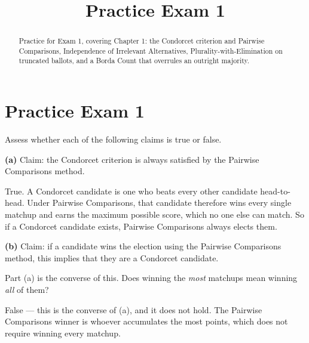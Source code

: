 \documentclass[12pt]{ximera}
\title{Practice Exam 1}
\begin{document}
\begin{abstract}
Practice for Exam 1, covering Chapter 1: the Condorcet criterion and Pairwise Comparisons,
Independence of Irrelevant Alternatives, Plurality-with-Elimination on truncated
ballots, and a Borda Count that overrules an outright majority.
\end{abstract}
\maketitle

\section*{Practice Exam 1}

\begin{problem}
Assess whether each of the following claims is true or false.

\begin{prompt}
\textbf{(a)} Claim: the Condorcet criterion is always satisfied by the Pairwise
Comparisons method.

\begin{multipleChoice}
\end{multipleChoice}

\begin{feedback}
True. A Condorcet candidate is one who beats every other candidate head-to-head. Under
Pairwise Comparisons, that candidate therefore wins every single matchup and earns the
maximum possible score, which no one else can match. So if a Condorcet candidate
exists, Pairwise Comparisons always elects them.
\end{feedback}
\end{prompt}

\begin{prompt}
\textbf{(b)} Claim: if a candidate wins the election using the Pairwise Comparisons
method, this implies that they are a Condorcet candidate.

\begin{multipleChoice}
\end{multipleChoice}

\begin{hint}
Part (a) is the converse of this. Does winning the \emph{most} matchups mean winning
\emph{all} of them?
\end{hint}

\begin{feedback}
False --- this is the converse of (a), and it does not hold. The Pairwise Comparisons
winner is whoever accumulates the most points, which does not require winning every
matchup.


\end{feedback}
\end{prompt}
\end{problem}
\end{document}
